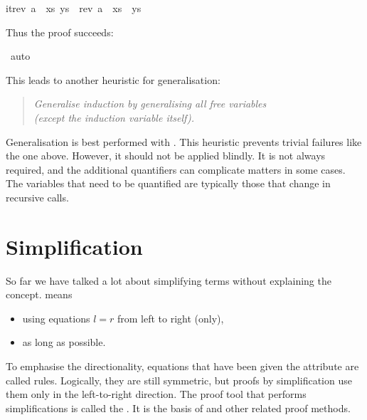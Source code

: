 \begin{isabellebody}
\begin{isamarkuptxt}
\begin{isabelle}
itrev\ {}a\ {}\ xs{}\ ys\ {}\ rev\ {}a\ {}\ xs{}\ {}\ ys%
\end{isabelle}
Thus the proof succeeds:%
\end{isamarkuptxt}%
\isamarkuptrue%
\isamarkupfalse%
\ auto\isanewline
{}\isamarkupfalse%
%
\endisatagproof
{\isafoldproof}%
%
\isadelimproof
%
\endisadelimproof
%
\begin{isamarkuptext}%
This leads to another heuristic for generalisation:
\begin{quote}
\emph{Generalise induction by generalising all free
variables\\ {\em(except the induction variable itself)}.}
\end{quote}
Generalisation is best performed with . 
This heuristic prevents trivial failures like the one above.
However, it should not be applied blindly.
It is not always required, and the additional quantifiers can complicate
matters in some cases. The variables that need to be quantified are typically
those that change in recursive calls.

\section{Simplification}

So far we have talked a lot about simplifying terms without explaining the concept.  means
\begin{itemize}
\item using equations $l = r$ from left to right (only),
\item as long as possible.
\end{itemize}
To emphasise the directionality, equations that have been given the
 attribute are called 
rules. Logically, they are still symmetric, but proofs by
simplification use them only in the left-to-right direction.  The proof tool
that performs simplifications is called the . It is the
basis of  and other related proof methods.


\end{isamarkuptext}
\end{isabellebody}
